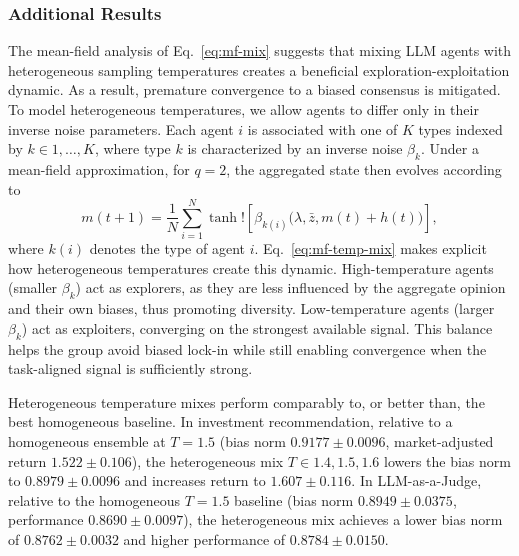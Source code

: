\documentclass{article}
\theoremstyle{plain}
\theoremstyle{definition}
\theoremstyle{remark}
\begin{document}
\subsubsection{Additional Results}\label{sec:real-additional-results}
The mean-field analysis of Eq.~\eqref{eq:mf-mix} suggests that mixing LLM agents with heterogeneous sampling temperatures creates a beneficial exploration-exploitation dynamic.
As a result, premature convergence to a biased consensus is mitigated.
To model heterogeneous temperatures, we allow agents to differ only in their inverse noise parameters.
Each agent $i$ is associated with one of $K$ types indexed by $k\in{1,\dots,K}$, where type $k$ is characterized by an inverse noise $\beta_k$.
Under a mean-field approximation, for $q=2$, the aggregated state then evolves according to
{\small\begin{equation}\label{eq:mf-temp-mix}
m(t+1)=\frac{1}{N}\sum_{i=1}^{N}\tanh!\left[\beta_{k(i)}
\bigl(\lambda,\bar{z},m(t)+h(t)\bigr)\right],
\end{equation}}
\hspace{-1mm}where $k(i)$ denotes the type of agent $i$.
Eq.~\eqref{eq:mf-temp-mix} makes explicit how heterogeneous temperatures create this dynamic.
High-temperature agents (smaller $\beta_{k}$) act as explorers, as they are less influenced by the aggregate opinion and their own biases, thus promoting diversity. Low-temperature agents (larger $\beta_{k}$) act as exploiters, converging on the strongest available signal.
This balance helps the group avoid biased lock-in while still enabling convergence when the task-aligned signal is sufficiently strong.

Heterogeneous temperature mixes perform comparably to, or better than, the best homogeneous baseline.
In investment recommendation, relative to a homogeneous ensemble at $T=1.5$ (bias norm $0.9177 \pm 0.0096$, market-adjusted return $1.522 \pm 0.106$), the heterogeneous mix $T\in{1.4,1.5,1.6}$ lowers the bias norm to $0.8979 \pm 0.0096$ and increases return to $1.607 \pm 0.116$.
In LLM-as-a-Judge, relative to the homogeneous $T=1.5$ baseline (bias norm $0.8949 \pm 0.0375$, performance $0.8690 \pm 0.0097$), the heterogeneous mix achieves a lower bias norm of $0.8762 \pm 0.0032$ and higher performance of $0.8784 \pm 0.0150$.
\end{document}
